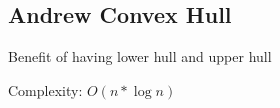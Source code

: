 \subsection{Andrew Convex Hull}

Benefit of having lower hull and upper hull

Complexity: $O(n*\log{n})$
